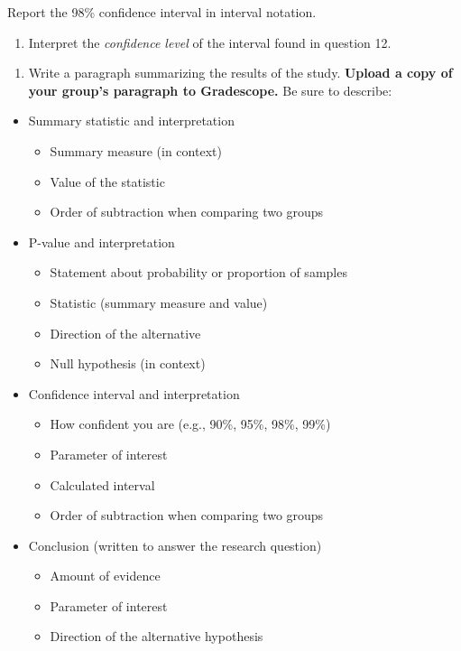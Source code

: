 \documentclass[
]{report}
\providecommand{\tightlist}{%
  \setlength{\itemsep}{0pt}\setlength{\parskip}{0pt}}
\begin{document}
Report the 98\% confidence interval in interval notation.

\vspace{0.3in}

\begin{enumerate}
\def\labelenumi{\arabic{enumi}.}
\setcounter{enumi}{13}
\tightlist
\item
  Interpret the \emph{confidence level} of the interval found in question 12.
\end{enumerate}

\vspace{0.8in}

\begin{enumerate}
\def\labelenumi{\arabic{enumi}.}
\setcounter{enumi}{14}
\tightlist
\item
  Write a paragraph summarizing the results of the study. \textbf{Upload a copy of your group's paragraph to Gradescope.} Be sure to describe:
\end{enumerate}

\begin{itemize}
\item
  Summary statistic and interpretation

  \begin{itemize}
  \item
    Summary measure (in context)
  \item
    Value of the statistic
  \item
    Order of subtraction when comparing two groups
  \end{itemize}
\item
  P-value and interpretation

  \begin{itemize}
  \item
    Statement about probability or proportion of samples
  \item
    Statistic (summary measure and value)
  \item
    Direction of the alternative
  \item
    Null hypothesis (in context)
  \end{itemize}
\item
  Confidence interval and interpretation

  \begin{itemize}
  \item
    How confident you are (e.g., 90\%, 95\%, 98\%, 99\%)
  \item
    Parameter of interest
  \item
    Calculated interval
  \item
    Order of subtraction when comparing two groups
  \end{itemize}
\item
  Conclusion (written to answer the research question)

  \begin{itemize}
  \item
    Amount of evidence
  \item
    Parameter of interest
  \item
    Direction of the alternative hypothesis
  \end{itemize}
\end{itemize}
\end{document}
